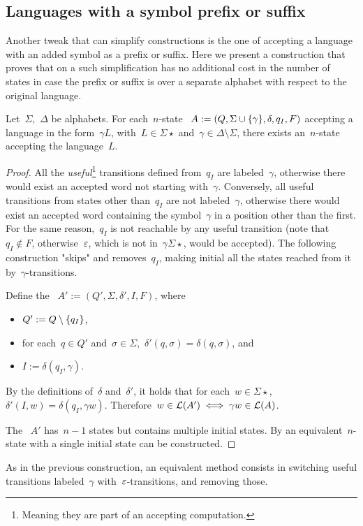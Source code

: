 \subsection{Languages with a symbol prefix or suffix}
Another tweak that can simplify constructions is the one of accepting a language with an added symbol as a prefix or suffix.
Here we present a construction that proves that on a \ONFA such simplification has no additional cost in the number of states in case the prefix or suffix is over a separate alphabet with respect to the original language.
\begin{thrm}
	Let~$\Sigma$,~$\Delta$ be alphabets.
	For each~$n$-state \ONFA~$A:=(Q,\Sigma\cup\{\gamma\},\delta,q_I,F)$ accepting a language in the form~$\gamma L$, with~$L\in\Sigma\star$ and~$\gamma\in\Delta\setminus\Sigma$, there exists an~$n$-state \ONFA accepting the language~$L$.
\end{thrm}
\begin{proof}
	All the \emph{useful}\footnote{Meaning they are part of an accepting computation.} transitions defined from~$q_I$ are labeled~$\gamma$, otherwise there would exist an accepted word not starting with~$\gamma$.
	Conversely, all useful transitions from states other than~$q_I$ are not labeled~$\gamma$, otherwise there would exist an accepted word containing the symbol~$\gamma$ in a position other than the first.
	For the same reason,~$q_I$ is not reachable by any useful transition (note that~$q_I\notin F$, otherwise~$\varepsilon$, which is not in~$\gamma\Sigma\star$, would be accepted).
	The following construction "skips" and removes~$q_I$, making initial all the states reached from it by~$\gamma$-transitions.

	Define the \ONFA~$A':=(Q',\Sigma,\delta',I,F)$, where
	\begin{itemize}
		\item $Q':=Q\setminus\{q_I\}$,
		\item for each~$q\in Q'$ and~$\sigma\in\Sigma$,~$\delta'(q,\sigma)=\delta(q,\sigma)$, and
		\item $I:=\delta(q_I,\gamma)$.
	\end{itemize}

	By the definitions of~$\delta$ and~$\delta'$, it holds that for each~$w\in\Sigma\star$,~$\delta'(I,w)=\delta(q_I,\gamma w)$.
	Therefore~$w\in\mathcal L(A')\iff \gamma w\in\mathcal L(A)$.

	The \ONFA~$A'$ has~$n-1$ states but contains multiple initial states. By  an equivalent~$n$-state \ONFA with a single initial state can be constructed.
\end{proof}
As in the previous construction, an equivalent method consists in switching useful transitions labeled~$\gamma$ with~$\varepsilon$-transitions, and removing those.

